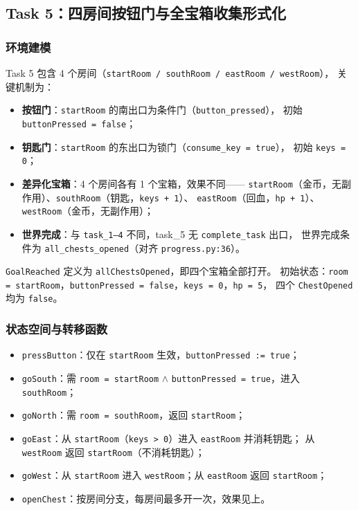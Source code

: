 \documentclass[12pt,a4paper]{ctexart}
\begin{document}
\subsection{Task 5：四房间按钮门与全宝箱收集形式化}

\subsubsection{环境建模}

Task 5 包含 4 个房间（\texttt{startRoom / southRoom / eastRoom / westRoom}），
关键机制为：
\begin{itemize}[leftmargin=2em]
  \item \textbf{按钮门}：\texttt{startRoom} 的南出口为条件门（\texttt{button\_pressed}），
        初始 \texttt{buttonPressed = false}；
  \item \textbf{钥匙门}：\texttt{startRoom} 的东出口为锁门（\texttt{consume\_key = true}），
        初始 \texttt{keys = 0}；
  \item \textbf{差异化宝箱}：4 个房间各有 1 个宝箱，效果不同——
        \texttt{startRoom}（金币，无副作用）、\texttt{southRoom}（钥匙，\texttt{keys + 1}）、
        \texttt{eastRoom}（回血，\texttt{hp + 1}）、\texttt{westRoom}（金币，无副作用）；
  \item \textbf{世界完成}：与 \texttt{task\_1--4} 不同，task\_5 无 \texttt{complete\_task} 出口，
        世界完成条件为 \texttt{all\_chests\_opened}（对齐 \texttt{progress.py:36}）。
\end{itemize}

\texttt{GoalReached} 定义为 \texttt{allChestsOpened}，即四个宝箱全部打开。
初始状态：\texttt{room = startRoom}，\texttt{buttonPressed = false}，\texttt{keys = 0}，\texttt{hp = 5}，
四个 \texttt{ChestOpened} 均为 \texttt{false}。

\subsubsection{状态空间与转移函数}

\begin{itemize}[leftmargin=2em]
  \item \texttt{pressButton}：仅在 \texttt{startRoom} 生效，\texttt{buttonPressed := true}；
  \item \texttt{goSouth}：需 \texttt{room = startRoom} \(\wedge\)
  \texttt{buttonPressed = true}，进入 \texttt{southRoom}；
  \item \texttt{goNorth}：需 \texttt{room = southRoom}，返回 \texttt{startRoom}；
  \item \texttt{goEast}：从 \texttt{startRoom}（\texttt{keys > 0}）进入 \texttt{eastRoom} 并消耗钥匙；
        从 \texttt{westRoom} 返回 \texttt{startRoom}（不消耗钥匙）；
  \item \texttt{goWest}：从 \texttt{startRoom} 进入 \texttt{westRoom}；从 \texttt{eastRoom} 返回 \texttt{startRoom}；
  \item \texttt{openChest}：按房间分支，每房间最多开一次，效果见上。
\end{itemize}
\end{document}
